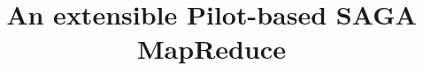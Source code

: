 \documentclass{acm_proc_article-sp}
\begin{document}
\title{An extensible Pilot-based SAGA MapReduce}

%
%
%
%
%
\end{document}
